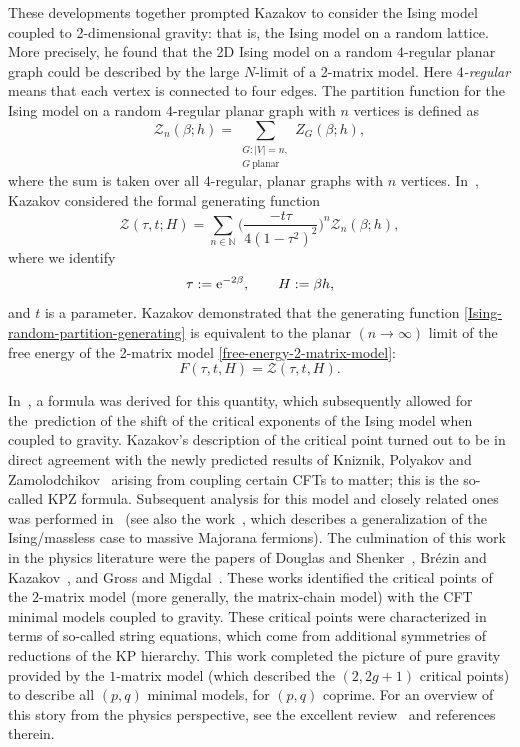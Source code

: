 \documentclass[10pt,a4paper]{amsart}
\numberwithin{equation}{section}
\begin{document}
These developments together prompted Kazakov to consider the Ising model coupled to 2-dimensional gravity: that is, the Ising model on a random lattice. More precisely, he found that the 2D Ising model on a random $4$-regular planar graph could be described by the large $N$-limit of a
2-matrix model. Here \textit{$4$-regular} means that each vertex is connected to four edges. The partition function for the Ising model on a random $4$-regular planar graph with $n$ vertices is defined as
 \begin{equation}\label{Ising-random-partition-n} %
 \mathcal{Z}_n(\beta;h) = \sum_{\substack{G:|V| = n,\\ G \ {\textrm{planar}}}} Z_G(\beta;h),
 \end{equation}
where the sum is taken over all $4$-regular, planar graphs with $n$ vertices. In~\cite{Kazakov1}, Kazakov considered the formal generating function
 \begin{equation}\label{Ising-random-partition-generating}
 \mathcal{Z}(\tau,t;H) = \sum_{n \in \mathbb{N}} \biggl(\frac{-t\tau}{4(1-\tau^2)^2}\biggr)^n \mathcal{Z}_n(\beta;h),
 \end{equation}
where we identify
 \begin{equation*}
 \tau := {\rm e}^{-2\beta},\qquad H := \beta h,
 \end{equation*}
and $t$ is a parameter. Kazakov demonstrated that the generating function \eqref{Ising-random-partition-generating} is equivalent to the planar $(n \to \infty)$ limit of the free energy of the 2-matrix model \eqref{free-energy-2-matrix-model}:
\begin{equation*}
 F(\tau,t,H) = \mathcal{Z}(\tau,t,H).
\end{equation*}

In~\cite{Kazakov2, Kazakov1}, a formula was derived for this quantity, which subsequently allowed for the~prediction of the shift of the critical exponents of the Ising model when coupled
to gravity. Kazakov's description of the critical point turned out to be in direct agreement with the newly predicted results of Kniznik, Polyakov and Zamolodchikov~\cite{KPZ} arising from coupling certain CFTs to matter; this is the so-called KPZ formula.
Subsequent analysis for this model and closely related ones was performed in~\cite{Kazakov2,Kazakov3} (see also the work~\cite{Zamolodchikov-Ishimoto}, which describes a generalization of the Ising/massless case to massive Majorana fermions). The culmination of this work in the physics literature were the papers of
Douglas and Shenker~\cite{DS}, Br\'{e}zin and Kazakov~\cite{KB}, and Gross and Migdal~\cite{GM1,GM2}. These works identified the critical points of the $2$-matrix model (more generally, the matrix-chain model) with the CFT minimal models coupled to gravity. These critical points were characterized in terms of so-called string equations, which come from additional symmetries of reductions of the KP hierarchy. This work completed the picture of pure gravity provided by the $1$-matrix model (which described the $(2,2g+1)$ critical points) to describe all $(p,q)$ minimal models, for $(p,q)$ coprime. For an overview of this story from the physics perspective, see
the excellent review~\cite{PGZ} and references therein.
\end{document}
